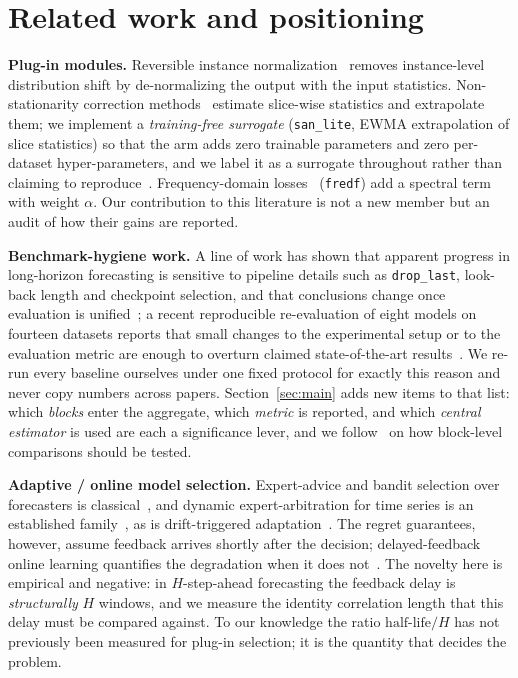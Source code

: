 \documentclass[a4paper,fleqn]{cas-sc}
\newcommand{\arm}[1]{\texttt{#1}}
\begin{document}
\section{Related work and positioning}

\textbf{Plug-in modules.} Reversible instance normalization~\cite{revin} removes
instance-level distribution shift by de-normalizing the output with the input
statistics. Non-stationarity correction methods~\cite{san} estimate slice-wise
statistics and extrapolate them; we implement a \emph{training-free surrogate}
(\arm{san\_lite}, EWMA extrapolation of slice statistics) so that the arm adds
zero trainable parameters and zero per-dataset hyper-parameters, and we label it
as a surrogate throughout rather than claiming to reproduce~\cite{san}.
Frequency-domain losses~\cite{fredf} (\arm{fredf}) add a spectral term with
weight $\alpha$. Our contribution to this literature is not a new member but an
audit of how their gains are reported.

\textbf{Benchmark-hygiene work.} A line of work has shown that apparent
progress in long-horizon forecasting is sensitive to pipeline details such as
\texttt{drop\_last}, look-back length and checkpoint selection, and that
conclusions change once evaluation is unified~\cite{tfb,tslib,dlinear}; a recent
reproducible re-evaluation of eight models on fourteen datasets reports that
small changes to the experimental setup or to the evaluation metric are enough
to overturn claimed state-of-the-art results~\cite{champions}. We re-run every
baseline ourselves under one fixed
protocol for exactly this reason and never copy numbers across papers.
Section~\ref{sec:main} adds new items to that list: which \emph{blocks} enter the
aggregate, which \emph{metric} is reported, and which \emph{central estimator} is
used are each a significance lever, and we follow~\cite{demsar} on how
block-level comparisons should be tested.

\textbf{Adaptive / online model selection.} Expert-advice and bandit selection
over forecasters is classical~\cite{cesabianchi}, and dynamic
expert-arbitration for time series is an established
family~\cite{arbitrage}, as is drift-triggered adaptation~\cite{gama}. The
regret guarantees, however, assume feedback arrives shortly after the decision;
delayed-feedback online learning quantifies the degradation when it does
not~\cite{joulani}. The novelty here is empirical and negative: in
$H$-step-ahead forecasting the feedback delay is \emph{structurally} $H$
windows, and we measure the identity correlation length that this delay must be
compared against. To our knowledge the ratio
$\text{half-life}/H$ has not previously been measured for plug-in selection;
it is the quantity that decides the problem.
\end{document}
